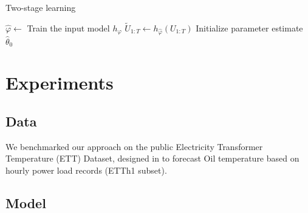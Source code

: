 \documentclass[conference]{IEEEtran}
\begin{document}
\begin{algorithm}
	\caption{Two-stage learning}
	\label{alg:particle_filter}
	\KwOut{$(\hat \varphi, \hat \theta)$}
	$\hat \varphi \gets$ Train the input model $h_\varphi$\;
	$\widetilde U_{1:T} \gets h_{\hat \varphi}(U_{1:T})$\;
	Initialize parameter estimate $\widehat \theta_0$\;

\end{algorithm}

\section{Experiments}
\label{sec:exp}
\subsection{Data}
\label{sub:data}
We benchmarked our approach on the public Electricity Transformer Temperature (ETT) Dataset, designed in \cite{Zhou2021Informer} to forecast Oil temperature based on hourly power load records (ETTh1 subset).

\subsection{Model}%
\label{sub:models}
\end{document}
